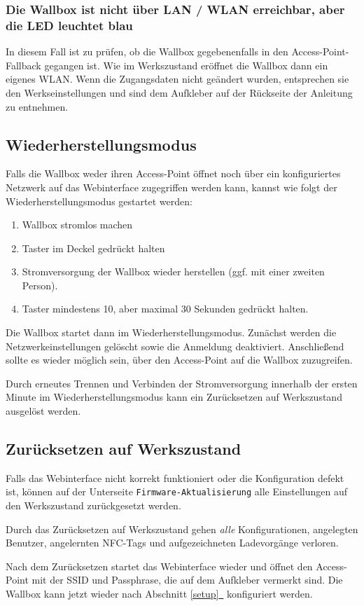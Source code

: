 \documentclass[a4paper,10pt]{article}
\newcommand{\hint}[1]{\begin{tcolorbox}[colback=boxgray,colframe=black,coltext=
white,title=Hinweis,left*=2mm,right*=2mm,boxsep=1mm,bottom=1mm,top=1mm]#1\end{tcolorbox}}
\newcommand*{\fullref}[1]{Abschnitt \hyperref[{#1}]{\ref*{#1}~\nameref*{#1}}}
\begin{document}
\begin{multicols*}{2}
    \subsubsection*{Die Wallbox ist nicht über LAN / WLAN erreichbar, aber die
	LED leuchtet blau}
    In diesem Fall ist zu prüfen, ob die Wallbox gegebenenfalls in den Access-Point-Fallback
    gegangen ist. Wie im Werkszustand eröffnet die Wallbox dann ein eigenes
    WLAN. Wenn die Zugangsdaten nicht geändert wurden, entsprechen sie den Werkseinstellungen und sind dem
    Aufkleber auf der Rückseite der Anleitung zu entnehmen.


    \subsection{Wiederherstellungsmodus}\label{recovery}
    Falls die Wallbox weder ihren Access-Point öffnet noch über ein konfiguriertes Netzwerk auf das Webinterface zugegriffen werden kann,
    kannst wie folgt der Wiederherstellungsmodus gestartet werden:
    \begin{enumerate}
     \item Wallbox stromlos machen
     \item Taster im Deckel gedrückt halten
     \item Stromversorgung der Wallbox wieder herstellen (ggf. mit einer zweiten Person).
     \item Taster mindestens 10, aber maximal 30 Sekunden gedrückt halten.
    \end{enumerate}
    Die Wallbox startet dann im Wiederherstellungsmodus. Zunächst werden die Netzwerkeinstellungen gelöscht sowie die Anmeldung deaktiviert.
    Anschließend sollte es wieder möglich sein, über den Access-Point auf die Wallbox zuzugreifen.

    Durch erneutes Trennen und Verbinden der Stromversorgung innerhalb der ersten Minute im Wiederherstellungsmodus kann ein Zurücksetzen auf Werkszustand ausgelöst werden.

    \subsection{Zurücksetzen auf Werkszustand}\label{reset}
    Falls das Webinterface nicht korrekt funktioniert oder die Konfiguration defekt ist,
    können auf der Unterseite \texttt{Firmware-Aktualisierung} alle Einstellungen auf den Werkszustand zurückgesetzt werden.
    \hint{Durch das Zurücksetzen auf Werkszustand gehen \textit{alle} Konfigurationen, angelegten Benutzer, angelernten NFC-Tags und aufgezeichneten Ladevorgänge verloren.}
    Nach dem Zurücksetzen startet das Webinterface wieder und öffnet
    den Access-Point mit der SSID und Passphrase, die auf dem Aufkleber vermerkt
    sind. Die Wallbox kann jetzt wieder nach \fullref{setup} konfiguriert werden.


\end{multicols*}
\end{document}
